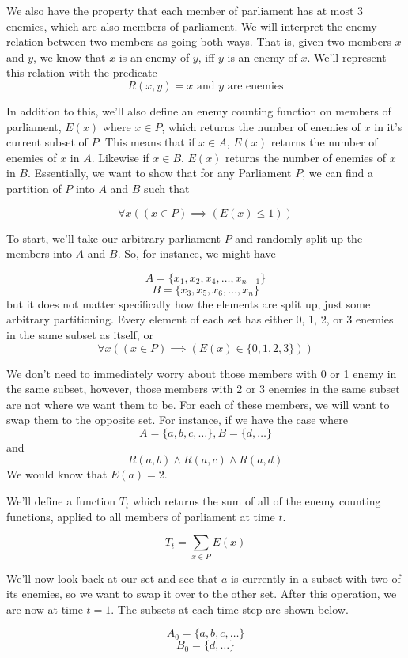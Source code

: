 \documentclass[12pt]{article}
\begin{document}
We also have the property that each member of parliament has at most 3 enemies, which are also members of parliament. We will interpret the enemy relation between two members as going both ways. That is, given two members $x$ and $y$, we know that $x$ is an enemy of $y$, iff $y$ is an enemy of $x$. We'll represent this relation with the predicate
\[R(x,y) = \text{$x$ and $y$ are enemies}\]

In addition to this, we'll also define an enemy counting function on members of parliament, $E(x)$ where $x \in P$, which returns the number of enemies of $x$ in it's current subset of $P$. This means that if $x \in A$, $E(x)$ returns the number of enemies of $x$ in $A$. Likewise if $x \in B$, $E(x)$ returns the number of enemies of $x$ in $B$. Essentially, we want to show that for any Parliament $P$, we can find a partition of $P$ into $A$ and $B$ such that

\[\forall x ((x \in P) \implies (E(x) \leq 1))\]

To start, we'll take our arbitrary parliament $P$ and randomly split up the members into $A$ and $B$. So, for instance, we might have

\[A = \{x_1, x_2, x_4, \dots, x_{n-1}\}\]
\[B = \{x_3, x_5, x_6, \dots, x_n\}\]
but it does not matter specifically how the elements are split up, just some arbitrary partitioning. Every element of each set has either 0, 1, 2, or 3 enemies in the same subset as itself, or
\[\forall x((x \in P) \implies (E(x) \in \{0,1,2,3\}))\]

We don't need to immediately worry about those members with 0 or 1 enemy in the same subset, however, those members with 2 or 3 enemies in the same subset are not where we want them to be. For each of these members, we will want to swap them to the opposite set. For instance, if we have the case where
\[A = \{a, b, c, \dots\}, B = \{d, \dots\}\]
and 
\[R(a, b) \land R(a, c) \land R(a, d)\]
We would know that $E(a) = 2$. 

We'll define a function $T_t$ which returns the sum of all of the enemy counting functions, applied to all members of parliament at time $t$.

\[T_t = \sum_{x \in P}E(x)\]

We'll now look back at our set and see that $a$ is currently in a subset with two of its enemies, so we want to swap it over to the other set. After this operation, we are now at time $t=1$. The subsets at each time step are shown below.

\[A_0 = \{a, b, c, \dots\}\]
\[B_0 = \{d, \dots\}\]
\end{document}
